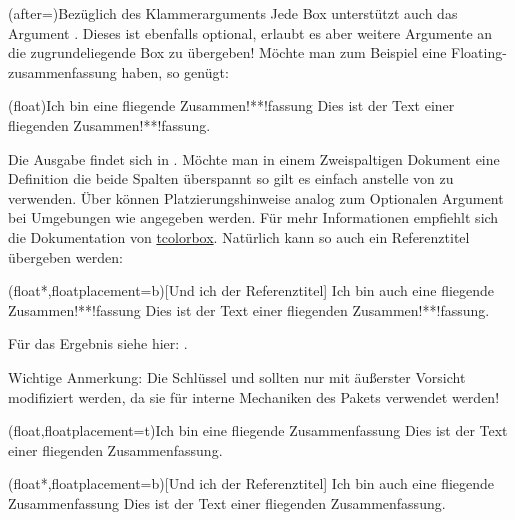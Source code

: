\documentclass{article}
\def\env#1{\texttt{\paletteB{#1}}}
\def\arg#1{\textit{\paletteB{#1}}}
\begin{document}
\begin{bemerkung*}(after=\bigskip){Bezüglich des Klammerarguments}
    \label{bem:optbracekey}Jede Box unterstützt auch das Argument \arg{Boxargs}. Dieses ist ebenfalls optional, erlaubt es aber weitere Argumente an die zugrundeliegende Box zu übergeben!
    Möchte man zum Beispiel eine Floating-zusammenfassung haben, so genügt:
\begin{latex}
\begin{zusammenfassung}(float){Ich bin eine fliegende Zusammen!**!fassung}
    Dies ist der Text einer fliegenden Zusammen!**!fassung.
\end{zusammenfassung}
\end{latex}
    Die Ausgabe findet sich in . Möchte man in einem Zweispaltigen Dokument eine Definition die beide Spalten überspannt so gilt es einfach  anstelle von  zu verwenden. Über  können Platzierungshinweise analog zum Optionalen Argument bei Umgebungen wie \env{figure} angegeben werden. Für mehr Informationen empfiehlt sich die Dokumentation von \href{https://www.ctan.org/pkg/tcolorbox}{tcolorbox}.
    Natürlich kann so auch ein Referenztitel übergeben werden:
\begin{latex}
\begin{zusammenfassung}(float*,floatplacement=b)[Und ich der Referenztitel]
            {Ich bin auch eine fliegende Zusammen!**!fassung}
    Dies ist der Text einer fliegenden Zusammen!**!fassung.
\end{zusammenfassung}
\end{latex}
Für das Ergebnis siehe hier: .

Wichtige Anmerkung: Die Schlüssel  und  sollten nur mit äußerster Vorsicht modifiziert werden, da sie für interne Mechaniken des Pakets verwendet werden!
\end{bemerkung*}

\begin{zusammenfassung}(float,floatplacement=t){Ich bin eine fliegende Zusammenfassung}
    \label{zsf:floatingex}Dies ist der Text einer fliegenden Zusammenfassung.
\end{zusammenfassung}

\begin{zusammenfassung}(float*,floatplacement=b)[Und ich der Referenztitel]
            {Ich bin auch eine fliegende Zusammenfassung}
    \label{zsf:floatingex2}Dies ist der Text einer fliegenden Zusammenfassung.
\end{zusammenfassung}
\end{document}
